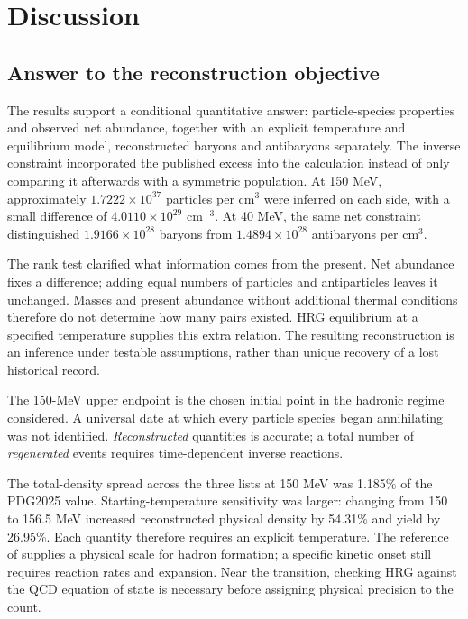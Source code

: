 \section{Discussion}
\subsection{Answer to the reconstruction objective}
The results support a conditional quantitative answer: particle-species properties and observed net abundance, together with an explicit temperature and equilibrium model, reconstructed baryons and antibaryons separately. The inverse constraint incorporated the published excess into the calculation instead of only comparing it afterwards with a symmetric population. At 150 MeV, approximately $1.7222\times10^{37}$ particles per cm$^3$ were inferred on each side, with a small difference of $4.0110\times10^{29}$ cm$^{-3}$. At 40 MeV, the same net constraint distinguished $1.9166\times10^{28}$ baryons from $1.4894\times10^{28}$ antibaryons per cm$^3$.

The rank test clarified what information comes from the present. Net abundance fixes a difference; adding equal numbers of particles and antiparticles leaves it unchanged. Masses and present abundance without additional thermal conditions therefore do not determine how many pairs existed. HRG equilibrium at a specified temperature supplies this extra relation. The resulting reconstruction is an inference under testable assumptions, rather than unique recovery of a lost historical record.

The 150-MeV upper endpoint is the chosen initial point in the hadronic regime considered. A universal date at which every particle species began annihilating was not identified. \emph{Reconstructed} quantities is accurate; a total number of \emph{regenerated} events requires time-dependent inverse reactions.

The total-density spread across the three lists at 150 MeV was 1.185\% of the PDG2025 value. Starting-temperature sensitivity was larger: changing from 150 to 156.5 MeV increased reconstructed physical density by 54.31\% and yield by 26.95\%. Each quantity therefore requires an explicit temperature. The reference of \citet{Bazavov2019} supplies a physical scale for hadron formation; a specific kinetic onset still requires reaction rates and expansion. Near the transition, checking HRG against the QCD equation of state is necessary before assigning physical precision to the count.

